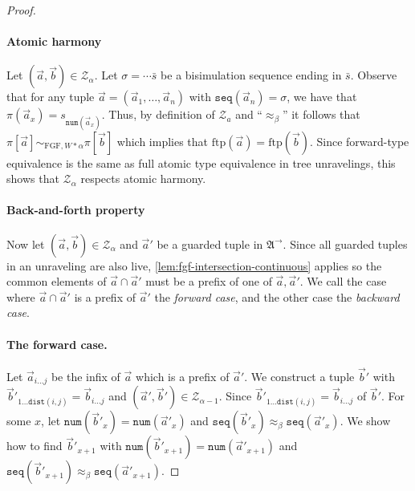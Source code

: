 \documentclass[draft]{scrartcl}
\theoremstyle{definition}
\newcommand{\struct}[1]{\mathfrak{#1}}
\newcommand{\seq}[1]{\mathtt{seq}({#1})}
\newcommand{\num}[1]{\mathtt{num}({#1})}
\newcommand{\dist}[2]{\mathtt{dist}({#1},{#2})}
\newcommand{\sij}{_{i\ldots{}j}}
\begin{document}
\begin{proof}
  \paragraph{Atomic harmony}
  Let $(\overrightarrow{a}, \overrightarrow{b}) \in \mathcal{Z}_{\alpha}$.
  Let $\sigma = \cdots{}\bar{s}$ be a bisimulation sequence ending in $\bar{s}$.
  Observe that for any tuple $\overrightarrow{a} = (\overrightarrow{a}_{1}, \ldots{}, \overrightarrow{a}_{n})$ with $\seq{\overrightarrow{a}_{n}} = \sigma$, we have that $\pi(\overrightarrow{a}_{x}) = s_{\num{\overrightarrow{a}_{x}}}$.
  Thus, by definition of $\mathcal{Z}_{a}$ and ``$\approx_{\beta}$'' it follows that $\pi[\overrightarrow{a}] \sim_{\mathrm{FGF},W*\alpha} \pi[\overrightarrow{b}]$ which implies that $\mathrm{ftp}(\overrightarrow{a}) = \mathrm{ftp}(\overrightarrow{b})$.
  Since forward-type equivalence is the same as full atomic type equivalence in tree unravelings, this shows that $\mathcal{Z}_{\alpha}$ respects atomic harmony.

  \paragraph{Back-and-forth property}
  Now let $(\overrightarrow{a}, \overrightarrow{b}) \in \mathcal{Z}_{\alpha}$ and $\overrightarrow{a}'$ be a guarded tuple in $\struct{A}^{\rightarrow}$.
  Since all guarded tuples in an unraveling are also live, \cref{lem:fgf-intersection-continuous} applies so the common elements of $\overrightarrow{a} \cap \overrightarrow{a}'$ must be a prefix of one of $\overrightarrow{a}, \overrightarrow{a}'$.
  We call the case where $\overrightarrow{a} \cap \overrightarrow{a}'$ is a prefix of $\overrightarrow{a}'$ the \emph{forward case}, and the other case the \emph{backward case}.

  \paragraph{The forward case.}
  Let $\overrightarrow{a}\sij$ be the infix of $\overrightarrow{a}$ which is a prefix of $\overrightarrow{a}'$.
  We construct a tuple $\overrightarrow{b}'$ with $\overrightarrow{b}'_{1\ldots{}\dist{i}{j}} = \overrightarrow{b}\sij$ and $(\overrightarrow{a}', \overrightarrow{b}') \in \mathcal{Z}_{\alpha-1}$.
  Since $\overrightarrow{b}'_{1\ldots{}\dist{i}{j}} = \overrightarrow{b}\sij$  of $\overrightarrow{b}'$.
  For some $x$, let $\num{\overrightarrow{b}'_{x}} = \num{\overrightarrow{a}'_{x}}$ and $\seq{\overrightarrow{b}'_{x}} \approx_{\beta} \seq{\overrightarrow{a}'_{x}}$.
  We show how to find $\overrightarrow{b}'_{x+1}$ with $\num{\overrightarrow{b}'_{x+1}} = \num{\overrightarrow{a}'_{x+1}}$ and $\seq{\overrightarrow{b}'_{x+1}} \approx_{\beta} \seq{\overrightarrow{a}'_{x+1}}$.


\end{proof}
\end{document}
